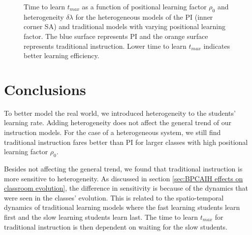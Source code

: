 \begin{figure}[htbp!]
   \caption[3D plots for the dependence of time to learn $t_{max}$ on both the positional learning factor $\rho_0$ and heterogeneity $\delta\lambda$]{Time to learn $t_{max}$ as a function of positional learning factor $\rho_0$ and heterogeneity $\delta\lambda$ for the heterogeneous models of the PI (inner corner SA) and traditional models with varying positional learning factor. 
   The blue surface represents PI and the orange surface represents traditional instruction.
   Lower time to learn $t_{max}$ indicates better learning efficiency.
   }
   \label{fig:2DBPCAIH rho-dl-t plots}
\end{figure}

\newpage %

\section{Conclusions}\label{sec:BPCAIH discussions}
To better model the real world, we introduced heterogeneity to the students' learning rate. 
Adding heterogeneity does not affect the general trend of our instruction models. 
For the case of a heterogeneous system, we still find traditional instruction fares better than PI for larger classes with high positional learning factor $\rho_0$.

Besides not affecting the general trend, we found that traditional instruction is more sensitive to heterogeneity. 
As discussed in section \ref{sec:BPCAIH effects on classroom evolution}, the difference in sensitivity is because of the dynamics that were seen in the classes' evolution. 
This is related to the spatio-temporal dynamics of traditional learning models where the fast learning students learn first and the slow learning students learn last.
The time to learn $t_{max}$ for traditional instruction is then dependent on waiting for the slow students.

